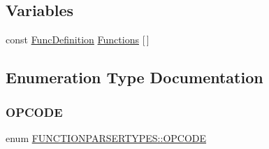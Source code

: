 \subsection*{Variables}
\begin{DoxyCompactItemize}
\item 
const \hyperlink{struct_f_u_n_c_t_i_o_n_p_a_r_s_e_r_t_y_p_e_s_1_1_func_definition}{Func\+Definition} \hyperlink{namespace_f_u_n_c_t_i_o_n_p_a_r_s_e_r_t_y_p_e_s_ae97b87cd905b84d3808b4268dcbf38cb}{Functions} \mbox{[}$\,$\mbox{]}
\end{DoxyCompactItemize}


\subsection{Enumeration Type Documentation}
\mbox{\label{namespace_f_u_n_c_t_i_o_n_p_a_r_s_e_r_t_y_p_e_s_aa8e540de01c96313b7e301c7b0d24104}} 
\subsubsection{\texorpdfstring{O\+P\+C\+O\+DE}{OPCODE}}
{\footnotesize\ttfamily enum \hyperlink{namespace_f_u_n_c_t_i_o_n_p_a_r_s_e_r_t_y_p_e_s_aa8e540de01c96313b7e301c7b0d24104}{F\+U\+N\+C\+T\+I\+O\+N\+P\+A\+R\+S\+E\+R\+T\+Y\+P\+E\+S\+::\+O\+P\+C\+O\+DE}}

